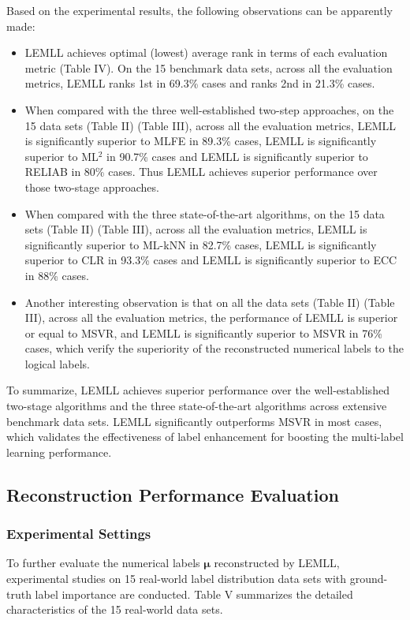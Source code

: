 \documentclass[conference]{IEEEtran}
\begin{document}
Based on the experimental results, the following observations can be apparently made:

\begin{itemize}
\item LEMLL achieves optimal (lowest) average rank in terms of each evaluation metric (Table IV). On the 15 benchmark data sets, across all the evaluation metrics, LEMLL ranks 1st in 69.3\% cases and ranks 2nd in 21.3\% cases.
\item When compared with the three well-established two-step approaches, on the 15 data sets (Table II) (Table III), across all the evaluation metrics, LEMLL is significantly superior to MLFE in 89.3\% cases, LEMLL is significantly superior to ML$^2$ in 90.7\% cases and LEMLL is significantly superior to RELIAB in 80\% cases. Thus LEMLL achieves superior performance over those two-stage approaches.
\item When compared with the three state-of-the-art algorithms, on the 15 data sets (Table II) (Table III), across all the evaluation metrics, LEMLL is significantly superior to ML-kNN in 82.7\% cases, LEMLL is significantly superior to CLR in 93.3\% cases and LEMLL is significantly superior to ECC in 88\% cases.
\item Another interesting observation is that on all the data sets (Table II) (Table III), across all the evaluation metrics, the performance of LEMLL is superior or equal to MSVR, and LEMLL is significantly superior to MSVR in 76\% cases, which verify the superiority of the reconstructed numerical labels to the logical labels.
\end{itemize}

To summarize, LEMLL achieves superior performance over the well-established two-stage algorithms and the three state-of-the-art algorithms across extensive benchmark data sets. LEMLL significantly outperforms MSVR in most cases, which validates the effectiveness of label enhancement for boosting the multi-label learning performance.


\subsection{Reconstruction Performance Evaluation}
\subsubsection{Experimental Settings}
To further evaluate the numerical labels $\bm{\mu}$ reconstructed by LEMLL, experimental studies on 15 real-world label distribution data sets \cite{geng2016label} with ground-truth label importance are conducted. Table V summarizes the detailed characteristics of the 15 real-world data sets.
\end{document}
